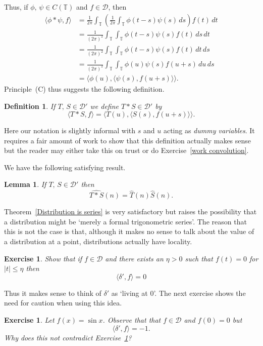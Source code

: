 \documentclass[12pt]{article}
\newtheorem{lemma}[theorem]{Lemma}
\newtheorem{definition}[theorem]{Definition}
\newtheorem{exercise}[theorem]{Exercise}
\theoremstyle{definition}
\begin{document}
Thus, if
$\phi,\,\psi\in C({\mathbb T})$ and $f\in{\mathcal D}$, then
\begin{align*}
\langle \phi*\psi,f\rangle
&=\frac{1}{2\pi}\int_{\mathbb T}
\left(\frac{1}{2\pi}\int_{\mathbb T}\phi(t-s)\psi(s)\,ds\right)
f(t)\,dt\\
&=\frac{1}{(2\pi)^{2}}\int_{\mathbb T}\int_{\mathbb T}
\phi(t-s)\psi(s)f(t)\,ds\,dt\\
&=\frac{1}{(2\pi)^{2}}\int_{\mathbb T}\int_{\mathbb T}
\phi(t-s)\psi(s)f(t)\,dt\,ds\\
&=\frac{1}{(2\pi)^{2}}\int_{\mathbb T}\int_{\mathbb T}
\phi(u)\psi(s)f(u+s)\,du\,ds\\
&=\langle \phi(u),\langle\psi(s),f(u+s)\rangle\rangle.
\end{align*}
Principle~(C) thus suggests the following definition.
\begin{definition} If $T,\,S\in{\mathcal D}'$
we define $T*S\in{\mathcal D}'$ by
\[ \langle T*S,f\rangle=\langle T(u),\langle S(s),f(u+s)\rangle\rangle.\]
\end{definition}
Here our notation is slightly informal with $s$ and $u$
acting as \emph{dummy variables}. It requires a fair amount
of work to show that this definition actually makes sense
but the reader may either take this on trust or do
Exercise~\ref{work convolution}. 

We have the following satisfying result.
\begin{lemma} If $T,\,S\in{\mathcal D}'$ then
\[\widehat{T*S}(n)=\hat{T}(n)\hat{S}(n).\]
\end{lemma}

Theorem~\ref{Distribution is series} is very satisfactory
but raises the possibility that a distribution might
be `merely a formal trigonometric series'. The reason
that this is not the case is that, although it makes
no sense to talk about the value of a distribution at a 
point, distributions actually have locality.
\begin{exercise}\label{live}
Show that if $f\in{\mathcal D}$ and there
exists an $\eta>0$ such that $f(t)=0$ for $|t|\leq \eta$
then
\[\langle \delta',f\rangle=0\]
\end{exercise}
Thus it makes sense to think of $\delta'$ as `living at $0$'.
The next exercise shows the need for caution when using this idea.
\begin{exercise} Let $f(x)=\sin x$. Observe that that $f\in{\mathcal D}$
and $f(0)=0$ but
\[\langle \delta',f\rangle=-1.\]
Why does this not contradict Exercise~\ref{live}?
\end{exercise}
\end{document}
